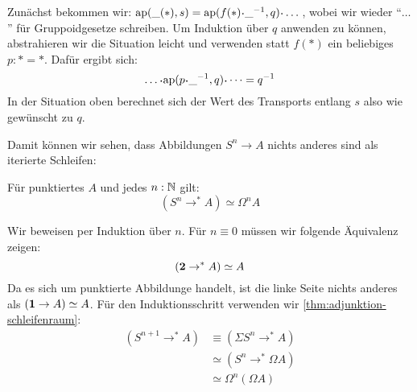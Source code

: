 \begin{beweis}
  Zunächst bekommen wir: $\mathrm{ap}(\_(\ast),s)=\mathrm{ap}(f(\ast)\kon\_^{-1},q)\kon\dots$, wobei wir wieder ``$\dots$'' für Gruppoidgesetze schreiben.
  Um Induktion über $q$ anwenden zu können, abstrahieren wir die Situation leicht und verwenden statt $f(\ast)$ ein beliebiges $p:\ast=\ast$.
  Dafür ergibt sich:
  \[
    \dots\kon\mathrm{ap}(p\kon \_^{-1},q)\kon\dots=q^{-1}
  \]
  In der Situation oben berechnet sich der Wert des Transports entlang $s$ also wie gewünscht zu $q$.
\end{beweis}

Damit können wir sehen, dass Abbildungen $S^n\to A$ nichts anderes sind als iterierte Schleifen:

\begin{korollar}
  \label{kor:schleifenraum-abbildungen}
  Für punktiertes $A$ und jedes $n:\mathbb{N}$ gilt:
  \[
    (S^n\to^\ast A)\simeq \Omega^n A
  \]
\end{korollar}
\begin{beweis}
  Wir beweisen per Induktion über $n$.
  Für $n\equiv 0$ müssen wir folgende Äquivalenz zeigen:
  \[
    (\mathbf{2}\to^\ast A)\simeq A
  \]
  Da es sich um punktierte Abbildunge handelt, ist die linke Seite nichts anderes als $(\mathbf{1}\to A)\simeq A$.
  Für den Induktionsschritt verwenden wir \cref{thm:adjunktion-schleifenraum}:
  \begin{align*}
    (S^{n+1}\to^\ast A)&\equiv (\Sigma S^n\to^\ast A) \\
    &\simeq (S^n\to^\ast \Omega A) \\
    &\simeq \Omega^n(\Omega A)
  \end{align*}
\end{beweis}


